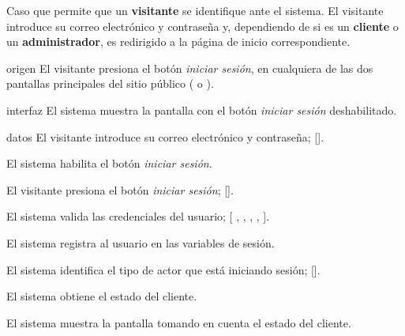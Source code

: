 %
%

{
  Caso que permite que un \textbf{visitante} se identifique ante el sistema. El
  visitante introduce su correo electrónico y contraseña y, dependiendo de
  si es un \textbf{cliente} o un \textbf{administrador}, es redirigido a la
  página de inicio correspondiente.

  \begin{trayectoriaPrincipal}

    \item[origen] El visitante presiona el botón \textit{iniciar sesión}, en
      cualquiera de las dos pantallas principales del sitio público
      ( o ).

    \item[interfaz] El sistema muestra la pantalla
       con el botón \textit{iniciar sesión}
      deshabilitado.

    \item[datos] El visitante introduce su correo electrónico y contraseña;
      [].

    \item El sistema habilita el botón \textit{iniciar sesión}.

    \item El visitante presiona el botón \textit{iniciar sesión};
      [].

    \item El sistema valida las credenciales del usuario; [%
      ,
      ,
      ,
      ,
      ].

    \item El sistema registra al usuario en las variables de sesión.

    \item El sistema identifica el tipo de actor que está iniciando
      sesión; [].

    \item El sistema obtiene el estado del cliente.

    \item El sistema muestra la pantalla
       tomando en cuenta el estado
      del cliente.


\end{trayectoriaPrincipal}}
